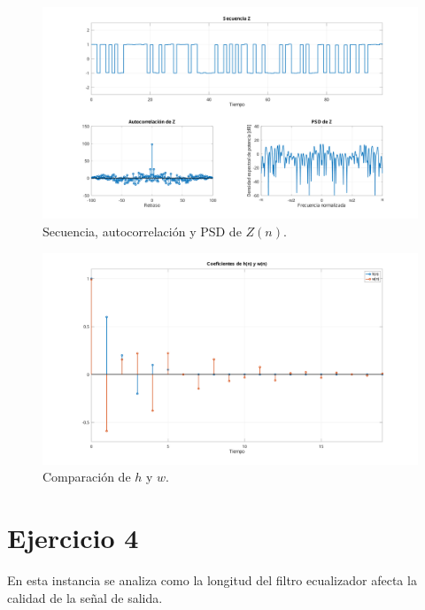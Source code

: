 \begin{figure}[h]
	\centering
	\includegraphics[width=1\linewidth]{img/ej3_z.pdf}
	\caption{Secuencia, autocorrelación y PSD de $Z(n)$.}
	\label{fig:ej3_z}
\end{figure}

\begin{figure}[h]
	\centering
	\includegraphics[width=1\linewidth]{img/ej3_coef.pdf}
	\caption{Comparación de $h$ y $w$.}
	\label{fig:ej3_coef}
\end{figure}

\section{Ejercicio 4}

En esta instancia se analiza como la longitud del filtro ecualizador afecta la calidad de la señal de salida.